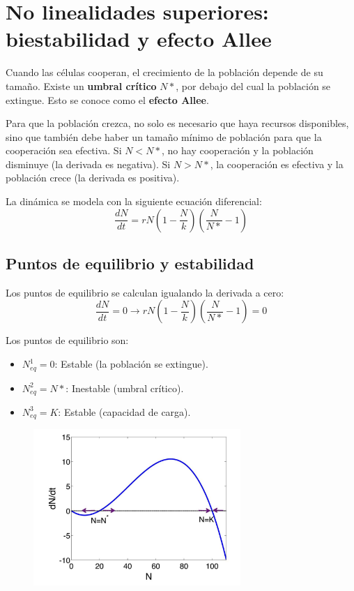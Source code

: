 \section{No linealidades superiores: biestabilidad y efecto Allee}
Cuando las células cooperan, el crecimiento de la población depende de su tamaño. Existe un \textbf{umbral crítico} $N*$, por debajo del cual la población se extingue. Esto se conoce como el \textbf{efecto Allee}.

Para que la población crezca, no solo es necesario que haya recursos disponibles, sino que también debe haber un tamaño mínimo de población para que la cooperación sea efectiva. Si $N < N*$, no hay cooperación y la población disminuye (la derivada es negativa). Si $N > N*$, la cooperación es efectiva y la población crece (la derivada es positiva).

La dinámica se modela con la siguiente ecuación diferencial:
$$\frac{dN}{dt} = rN (1 - \frac{N}{k}) (\frac{N}{N*} - 1)$$

\subsection{Puntos de equilibrio y estabilidad}
Los puntos de equilibrio se calculan igualando la derivada a cero:
$$\frac{dN}{dt} = 0 \rightarrow rN(1 - \frac{N}{k})(\frac{N}{N*} - 1) = 0$$

Los puntos de equilibrio son:
\begin{itemize}
\item $N^1_{eq} = 0$: Estable (la población se extingue).
\item $N^2_{eq} = N*$: Inestable (umbral crítico).
\item $N^3_{eq} = K$: Estable (capacidad de carga).
\end{itemize}

\begin{figure}[h]
\centering
\includegraphics[width = 0.7\textwidth]{figs/bistability-graph.png}
\end{figure}


